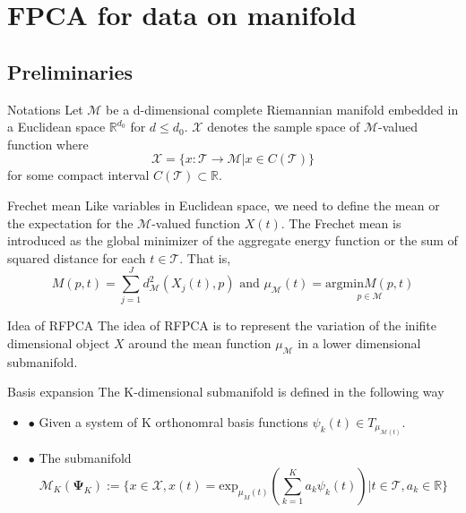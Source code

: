 \documentclass{beamer}
\begin{document}
\section{FPCA for data on manifold}
\subsection{Preliminaries}
\begin{frame}{Notations}
Let $\mathcal{M}$ be a d-dimensional complete Riemannian manifold embedded in a Euclidean space $\mathbb{R}^{d_{0}}$ for $d \leq d_{0}$. $\mathcal{X}$ denotes the sample space of  $\mathcal{M}$-valued function where
\begin{equation*}
\mathcal{X} = \{x : \mathcal{T} \rightarrow \mathcal{M} | x \in C(\mathcal{T})\}
\end{equation*}
for some compact interval $C(\mathcal{T}) \subset \mathbb{R}$.
\end{frame}


\begin{frame}{Frechet mean}
Like variables in Euclidean space, we need to define the mean or the expectation for the $\mathcal{M}$-valued function $X(t)$. The Frechet mean is introduced as the global minimizer of the aggregate energy function or the sum of squared distance for each $t \in \mathcal{T}$. That is,
\begin{equation*}
M(p,t) = \sum_{j=1}^{J}d^{2}_{\mathcal{M}}(X_{j}(t),p) \text{ and } \mu_{\mathcal{M}}(t) = \underset{p\in\mathcal{M}}{\text{argmin}M(p,t)}
\end{equation*}
\end{frame}

\begin{frame}{Idea of RFPCA}
The idea of RFPCA is to represent the variation of the inifite dimensional object $X$ around the mean function $\mu_{\mathcal{M}}$ in a lower dimensional submanifold.
\end{frame}

\begin{frame}{Basis expansion}
The K-dimensional submanifold is defined in the following way
\begin{itemize}
  \item $\bullet$ Given a system of K orthonomral basis functions $\psi_{k}(t) \in T_{\mu_{\mathcal{M}(t)}}$.
  \item $\bullet$ The submanifold
  \begin{equation*}
  \mathcal{M}_{K}(\bm{\Psi}_{K}):= \{x\in\mathcal{X},x(t) = \text{exp}_{\mu_{M}(t)}(\sum_{k=1}^{K}a_{k}\psi_{k}(t))| t\in\mathcal{T},a_{k}\in\mathbb{R}\}
  \end{equation*}
\end{itemize}
\end{frame}
\end{document}
